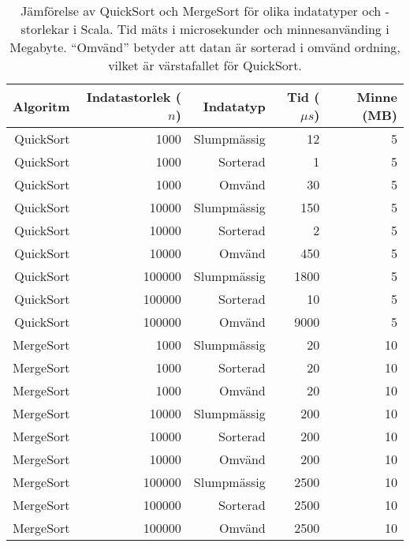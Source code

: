 \documentclass[a4paper,12pt]{article}   %
\begin{document}
\begin{table}[h]
    \centering
    \begin{tabular}{r|r|r|r|r}
        Algoritm  & Indatastorlek ($n$) & Indatatyp   & Tid ($\mu s$) & Minne (MB) \\
        \hline
        \hline
        QuickSort & 1000                & Slumpmässig & 12       & 5          \\
        QuickSort & 1000                & Sorterad    & 1        & 5          \\
        QuickSort & 1000                & Omvänd      & 30       & 5          \\
        \hline
        QuickSort & 10000               & Slumpmässig & 150      & 5          \\
        QuickSort & 10000               & Sorterad    & 2        & 5          \\
        QuickSort & 10000               & Omvänd      & 450      & 5          \\
        \hline
        QuickSort & 100000              & Slumpmässig & 1800     & 5          \\
        QuickSort & 100000              & Sorterad    & 10       & 5          \\
        QuickSort & 100000              & Omvänd      & 9000     & 5          \\
        \hline
        \hline
        MergeSort & 1000                & Slumpmässig & 20       & 10         \\
        MergeSort & 1000                & Sorterad    & 20       & 10         \\
        MergeSort & 1000                & Omvänd      & 20       & 10         \\
        \hline
        MergeSort & 10000               & Slumpmässig & 200      & 10         \\
        MergeSort & 10000               & Sorterad    & 200      & 10         \\
        MergeSort & 10000               & Omvänd      & 200      & 10         \\
        \hline
        MergeSort & 100000              & Slumpmässig & 2500     & 10         \\
        MergeSort & 100000              & Sorterad    & 2500     & 10         \\
        MergeSort & 100000              & Omvänd      & 2500     & 10         \\
        \hline
    \end{tabular}
    \caption{Jämförelse av QuickSort och MergeSort för olika indatatyper och -storlekar i Scala. Tid mäts i microsekunder och minnesanvänding i Megabyte. ``Omvänd'' betyder att datan är sorterad i omvänd ordning, vilket är värstafallet för QuickSort.}
    \label{tab:sorteringsalgoritmer}
\end{table}
\end{document}
